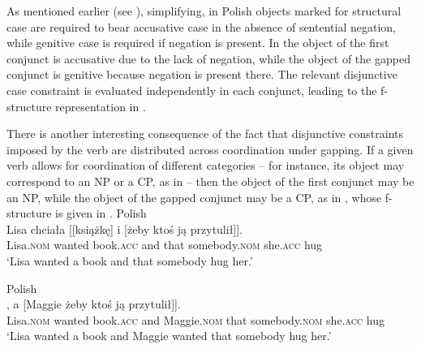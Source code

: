 \documentclass[output=paper]{../langscibook}
\begin{document}
As
mentioned earlier (see ), simplifying, in Polish objects marked for structural case are required
to bear accusative case in the absence of sentential negation, while
genitive case is required if negation is present. In
 the object of the first conjunct is accusative
due to the lack of negation, while the object of the gapped conjunct
is genitive because negation is present there. The relevant disjunctive
case constraint is evaluated independently in each conjunct, leading
to the f-structure representation in .

\hspace*{-3pt}There is another interesting consequence of the fact that disjunctive constraints imposed by the verb are
distributed across coordination under gapping. If a given verb allows for coordination of different
categories – for instance, its object may correspond to an NP or a CP,
as in  – then the object of the first conjunct
may be an NP, while the object of the gapped conjunct may be a CP, as
in , whose f-structure is given in
.
\ea\label{ex:pat:prz:17:38}
  Polish\\\gll
    Lisa chciała [[książkę] i [żeby ktoś ją przytulił]]. \\
    Lisa.\textsc{nom} wanted \phtm{[[}book.\textsc{acc} and \phtm{[}that
    somebody.\textsc{nom} she.\textsc{acc} hug\\
\glt‘Lisa wanted a book and that somebody hug her.’\\ \hspace*{\fill} \citep[(38)]{PatejukPrzepiorkowski2017}\z

\ea\label{ex:pat:prz:17:39}
  Polish\\\gll
    [[Lisa \tightuline{chciała} książkę], a [Maggie żeby ktoś ją przytulił]]. \\
    \phtm{[[}Lisa.\textsc{nom} wanted book.\textsc{acc} and \phtm{[}Maggie.\textsc{nom} that
    somebody.\textsc{nom} she.\textsc{acc} hug\\
    \glt‘Lisa wanted a book and Maggie wanted that somebody hug her.’\\ \hspace*{\fill} \citep[(39)]{PatejukPrzepiorkowski2017}\z
    
\end{document}
